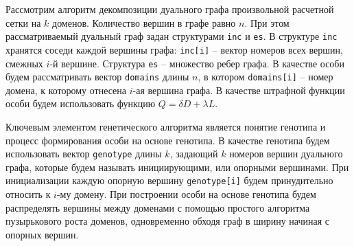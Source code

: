 Рассмотрим алгоритм декомпозиции дуального графа произвольной расчетной сетки на $k$ доменов.
Количество вершин в графе равно $n$.
При этом рассматриваемый дуальный граф задан структурами \texttt{inc} и \texttt{es}.
В структуре \texttt{inc} хранятся соседи каждой вершины графа: \texttt{inc[i]} -- вектор номеров всех вершин, смежных $i$-й вершине.
Структура \texttt{es} -- множество ребер графа.
В качестве особи будем рассматривать вектор \texttt{domains} длины $n$, в котором \texttt{domains[i]} -- номер домена, к которому отнесена $i$-ая вершина графа.
В качестве штрафной функции особи будем использовать функцию $Q = \delta D + \lambda L$.

Ключевым элементом генетического алгоритма является понятие генотипа и процесс формирования особи на основе генотипа.
В качестве генотипа будем использовать вектор \texttt{genotype} длины $k$, задающий $k$ номеров вершин дуального графа, которые будем называть инициирующими, или опорными вершинами.
При инициализации каждую опорную вершину \texttt{genotype[i]} будем принудительно относить к $i$-му домену.
При построении особи на основе генотипа будем распределять вершины между доменами с помощью простого алгоритма пузырькового роста доменов, одновременно обходя граф в ширину начиная с опорных вершин.

%
%
%

